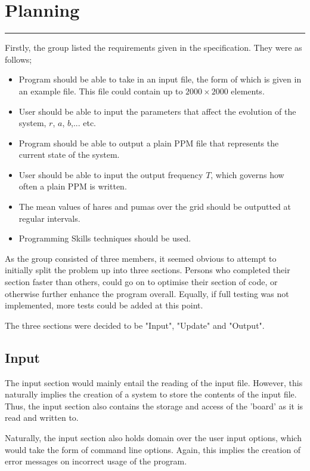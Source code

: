 \section{Planning}
\vspace{-2em}\rule{\textwidth}{1pt}\vspace{1em}

	Firstly, the group listed the requirements given in the specification.
	They were as follows;
	\begin{itemize}
		\item Program should be able to take in an input file, the form of which is given in an example file.
			This file could contain up to $2000\times2000$ elements.
		\item User should be able to input the parameters that affect the evolution of the system, $r$, $a$, $b$,... etc.
		\item Program should be able to output a plain PPM file that represents the current state of the system.
		\item User should be able to input the output frequency $T$, which governs how often a plain PPM is written.
		\item The mean values of hares and pumas over the grid should be outputted at regular intervals.
		\item Programming Skills techniques should be used.
	\end{itemize}
	As the group consisted of three members, it seemed obvious to attempt to initially split the problem up into three sections.
	Persons who completed their section faster than others, could go on to optimise their section of code, or otherwise further enhance the program overall.
	Equally, if full testing was not implemented, more tests could be added at this point.
	
	The three sections were decided to be "Input", "Update" and "Output".

	\subsection{Input}
		The input section would mainly entail the reading of the input file.
		However, this naturally implies the creation of a system to store the contents of the input file.
		Thus, the input section also contains the storage and access of the 'board' as it is read and written to.
		
		Naturally, the input section also holds domain over the user input options, which would take the form of command line options.
		Again, this implies the creation of error messages on incorrect usage of the program.
		
